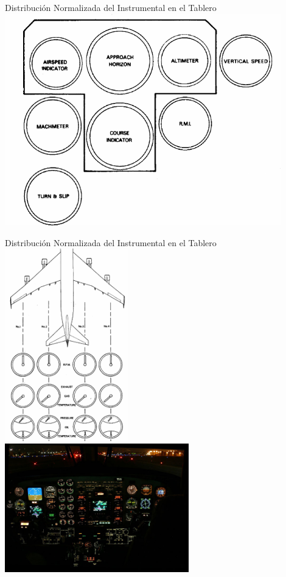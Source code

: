 \documentclass[10pt]{beamer}
\begin{document}
\begin{frame}{Distribuci\'on Normalizada del Instrumental en el
 Tablero}
\includegraphics[width=0.9\textwidth]{imagenes/1.3.distribucion.normalizada.instrumental.en.tablero/6.png}

\end{frame}

\begin{frame}{Distribuci\'on Normalizada del Instrumental en el
 Tablero}
\includegraphics[width=0.4\textwidth]{imagenes/1.3.distribucion.normalizada.instrumental.en.tablero/instrumentos_motor.png}
\includegraphics[width=0.6\textwidth]{imagenes/1.3.distribucion.normalizada.instrumental.en.tablero/iluminacion.jpg}

\end{frame}
\end{document}
